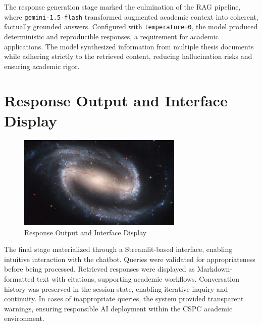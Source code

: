 \begin{refsection}
The response generation stage marked the culmination of the RAG pipeline, where \texttt{gemini-1.5-flash} transformed augmented academic context into coherent, factually grounded answers. Configured with \texttt{temperature=0}, the model produced deterministic and reproducible responses, a requirement for academic applications. The model synthesized information from multiple thesis documents while adhering strictly to the retrieved content, reducing hallucination risks and ensuring academic rigor.

\section{Response Output and Interface Display}

\begin{figure}[h]
    \centering
    \includegraphics[width=0.7\textwidth]{figures/sampleFig1.jpg}
    \caption{Response Output and Interface Display}
\end{figure}

The final stage materialized through a Streamlit-based interface, enabling intuitive interaction with the chatbot. Queries were validated for appropriateness before being processed. Retrieved responses were displayed as Markdown-formatted text with citations, supporting academic workflows. Conversation history was preserved in the session state, enabling iterative inquiry and continuity. In cases of inappropriate queries, the system provided transparent warnings, ensuring responsible AI deployment within the CSPC academic environment.


\clearpage

\printbibliography[heading=subbibintoc, title={\centering Notes}]
\end{refsection}